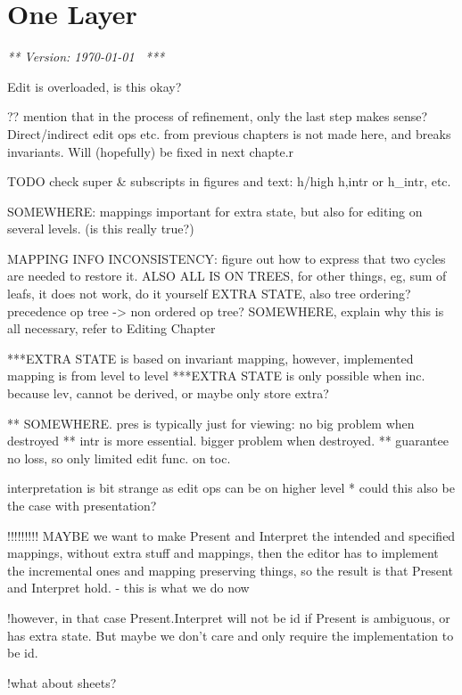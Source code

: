 \chapter{One Layer}
\label{chap:singleLayer}

{\em *** Version: \today~ ***}

\bc
Edit is overloaded, is this okay?


?? mention that in the process of refinement, only the last step makes sense? Direct/indirect edit ops etc. from previous chapters is not made here, and breaks invariants. Will (hopefully) be fixed in next chapte.r


TODO
check super & subscripts in figures and text: h/high h,intr or h_intr, etc.

SOMEWHERE: mappings important for extra state, but also for editing on several levels. (is this really true?)

MAPPING INFO INCONSISTENCY: figure out how to express that two cycles are needed to restore it.
ALSO ALL IS ON TREES, for other things, eg, sum of leafs, it does not work, do it yourself
EXTRA STATE, also tree ordering? precedence op tree -> non ordered op tree?
SOMEWHERE, explain why this is all necessary, refer to Editing Chapter


***EXTRA STATE is based on invariant mapping, however, implemented mapping is from level to level
***EXTRA STATE is only possible when inc. because lev, cannot be derived, or maybe only store extra?

** SOMEWHERE. pres is typically just for viewing: no big problem when destroyed
** intr is more essential. bigger problem when destroyed.
** guarantee no loss, so only limited edit func. on toc.

interpretation is bit strange as edit ops can be on higher level
* could this also be the case with presentation?


!!!!!!!!!
MAYBE we want to make Present and Interpret the intended and specified mappings, 
without extra stuff and mappings, then the editor has to implement the incremental ones
 and mapping preserving things, so the result is that Present and Interpret hold.
- this is what we do now

!however, in that case Present.Interpret will not be id if Present is ambiguous, or 
has extra state. But maybe we don't care and only require the implementation to be id.

!what about sheets? 

